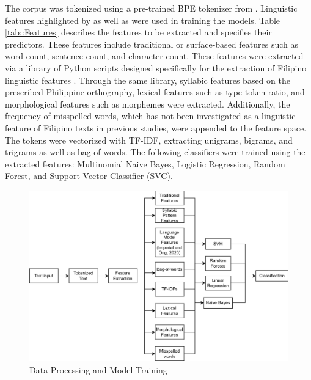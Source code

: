 The corpus was tokenized using a pre-trained BPE tokenizer from . Linguistic features highlighted by  as well as  were used in training the models. Table \ref{tab::Features} describes the features to be extracted and specifies their predictors. These features include traditional or surface-based  features such as word count, sentence count, and character count. These features were extracted via a library of Python scripts designed specifically for the extraction of Filipino linguistic features \cite{imperial-2020, imperial-2021}. Through the same library, syllabic features based on the prescribed Philippine orthography, lexical features such as type-token ratio, and morphological features such as morphemes were extracted. Additionally, the frequency of misspelled words, which has not been investigated as a linguistic feature of Filipino texts in previous studies, were appended to the feature space. The tokens were vectorized with TF-IDF, extracting unigrams, bigrams, and trigrams as well as bag-of-words. The following classifiers were trained using the extracted features: Multinomial Naive Bayes, Logistic Regression, Random Forest, and Support Vector Classifier (SVC).

\begin{figure}[h]
\includegraphics[width=\textwidth,height=\textheight,keepaspectratio]{figures/Model Training.png}
  \caption{Data Processing and Model Training}
  \label{fig:Model}
\end{figure}

\clearpage

